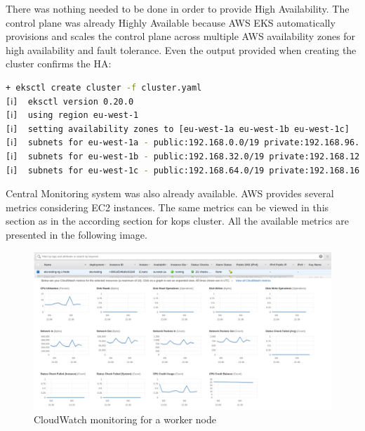 There was nothing needed to be done in order to provide High Availability. The control plane was already Highly Available because AWS EKS automatically provisions and scales the control plane across multiple AWS availability zones for high availability and fault tolerance\cite{eks-faqs}. Even the output provided when creating the cluster confirms the HA:
\begin{lstlisting}[basicstyle=\tiny,caption={Output from creating a eksctl cluster},captionpos=b,language=Bash,xleftmargin=1cm]
+ eksctl create cluster -f cluster.yaml
[ℹ]  eksctl version 0.20.0
[ℹ]  using region eu-west-1
[ℹ]  setting availability zones to [eu-west-1a eu-west-1b eu-west-1c]
[ℹ]  subnets for eu-west-1a - public:192.168.0.0/19 private:192.168.96.0/19
[ℹ]  subnets for eu-west-1b - public:192.168.32.0/19 private:192.168.128.0/19
[ℹ]  subnets for eu-west-1c - public:192.168.64.0/19 private:192.168.160.0/19
\end{lstlisting}

Central Monitoring system was also already available. AWS provides several metrics considering EC2 instances. The same metrics can be viewed in this section as in the according section for kops cluster. All the available metrics are presented in the following image.
\begin{figure}[H]
    \centering
    \includegraphics[width=17cm]{figures/eks-monitoring-ec2-node.png}
    \captionsetup{justification=centering,margin=2cm}
    \caption{CloudWatch monitoring for a worker node}
\end{figure}

